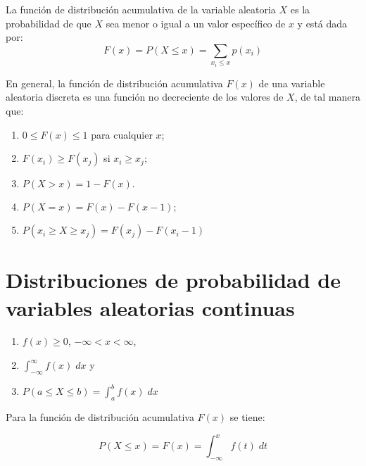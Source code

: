 \begin{tcolorbox}[colframe=white]
	\begin{def.}
	    La función de distribución acumulativa de la variable aleatoria $X$ es la probabilidad de que $X$ sea menor o igual a un valor específico de $x$ y está dada por:
	    $$F(x) = P(X\leq x) = \sum\limits_{x_i \leq x} p(x_i)$$
	\end{def.}
\end{tcolorbox}

En general, la función de distribución acumulativa $F(x)$ de una variable aleatoria discreta es una función no decreciente de los valores de $X$, de tal manera que:
\begin{enumerate}[\bfseries 1.]
    \item $0\leq F(x) \leq 1$ para cualquier $x$;
    \item $F(x_i)\geq F(x_j)$ si $x_i\geq x_j;$
    \item $P(X>x) = 1 - F(x).$
    \item $P(X=x) = F(x) - F(x-1);$
    \item $P(x_i \geq X \geq x_j) = F(x_j) - F(x_i - 1)$
\end{enumerate}

\section{Distribuciones de probabilidad de variables aleatorias continuas}

\begin{tcolorbox}[colframe=white]
    \begin{def.}
	\begin{enumerate}[\bfseries 1.]
	    \item $f(x)\geq 0$, $-\infty<x<\infty$,
	    \item $\displaystyle\int_{-\infty}^\infty f(x) \;dx$ y 
	    \item $P(a\leq X \leq b) = \displaystyle\int_{a}^{b} f(x) \; dx$
	\end{enumerate}
    \end{def.}
\end{tcolorbox}

Para la función de distribución acumulativa $F(x)$ se tiene:
\begin{tcolorbox}[colframe=white]
    $$P(X\leq x) = F(x) = \int_{-\infty}^x f(t) \; dt$$
\end{tcolorbox}

